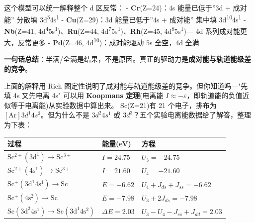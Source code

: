 这个模型可以统一解释整个 d 区反常：
- \textbf{Cr}(Z=24)：4s 能量已低于''3d + 成对能'' \箭 分散填 3d\textsuperscript{5}4s\textsuperscript{1}
- \textbf{Cu}(Z=29)：3d 能量已低于''4s + 成对能'' \箭 集中填 3d\textsuperscript{10}4s\textsuperscript{1}
- \textbf{Nb}(Z=41, 4d\textsuperscript{4}5s\textsuperscript{1})、\textbf{Ru}(Z=44, 4d\textsuperscript{7}5s\textsuperscript{1})、\textbf{Rh}(Z=45, 4d\textsuperscript{8}5s\textsuperscript{1})--- 4d 系列成对能更大，反常更多
- \textbf{Pd}(Z=46, 4d\textsuperscript{10})：成对能驱动 \箭 5s 全空，4d 全满

\textbf{一句话总结}：半满/全满是结果，不是原因。真正的驱动力是\textbf{成对能与轨道能级差的竞争}。

上面的解释用 Rich 图定性说明了成对能与轨道能级差的竞争。但你知道吗---"先填 4s 又先电离 4s" 可以用 \textbf{Koopmans 定理}(电离能 \(I \approx -\varepsilon\)，即轨道能的负值近似等于电离能)从实验数据中算出来。
Sc(Z=21)有 21 个电子，排布为 \([\mathrm{Ar}]3d^1 4s^2\)。但为什么不是 \(3d^2 4s^1\) 或 \(3d^3\)？五个实验电离能数据给了解答，整理为下表：

{\def\LTcaptype{none} %
\begin{longtable}[]{@{}
  >{\raggedright\arraybackslash}p{}
  >{\centering\arraybackslash}p{}
  >{\raggedright\arraybackslash}p{}@{}}
\toprule\noalign{}
\begin{minipage}[b]{\linewidth}\raggedright
过程
\end{minipage} & \begin{minipage}[b]{\linewidth}\centering
能量(eV)
\end{minipage} & \begin{minipage}[b]{\linewidth}\raggedright
方程
\end{minipage} \\
\midrule\noalign{}
\endhead
\bottomrule\noalign{}
\endlastfoot
\(\mathrm{Sc^{2+}(3d^1) \rightarrow Sc^{3+}}\) & \(I = 24.75\) & \(U_3 = -24.75\) \\
\(\mathrm{Sc^{2+}(4s^1) \rightarrow Sc^{3+}}\) & \(I = 21.60\) & \(U_4 = -21.60\) \\
\(\mathrm{Sc^{+}(3d^1 4s^1) \rightarrow Sc}\) & \(E = -6.62\) & \(U_4 + J_{ds} + J_{ss} = -6.62\) \\
\(\mathrm{Sc^{+}(4s^2) \rightarrow Sc}\) & \(E = -7.98\) & \(U_3 + 2J_{ds} = -7.98\) \\
\(\mathrm{Sc(3d^2 4s^1) \rightarrow Sc(3d^1 4s^2)}\) & \(\Delta E = 2.03\) & \(U_3 - U_4 - J_{ss} + J_{dd} = 2.03\) \\
\end{longtable}
}

